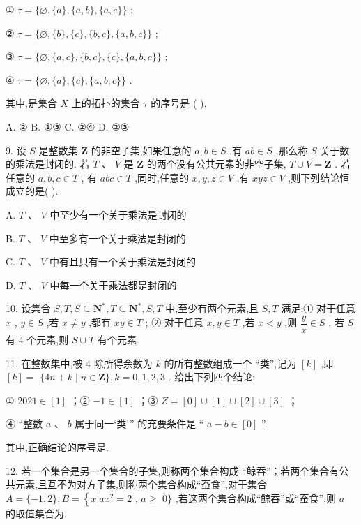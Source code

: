 ① $\tau  = \{ \varnothing ,\{ a\} ,\{ a,b\} ,\{ a,c\} \}$ ;

② $\tau  = \{ \varnothing ,\{ b\} ,\{ c\} ,\{ b,c\} ,\{ a,b,c\} \}$ ;

③ $\tau  = \{ \varnothing ,\{ a,c\} ,\{ b,c\} ,\{ c\} ,\{ a,b,c\} \}$ ;

④ $\tau  = \{ \varnothing ,\{ a\} ,\{ c\} ,\{ a,b,c\} \}$ .

其中,是集合 $X$ 上的拓扑的集合 $\tau$ 的序号是 (   ).

A. ② B. ①③ C. ②④ D. ②③

9. 设 $S$ 是整数集 $\mathbf{Z}$ 的非空子集,如果任意的 $a,b \in  S$ ,有 ${ab} \in  S$ ,那么称 $S$ 关于数的乘法是封闭的. 若 $T\text{ 、 }V$ 是 $\mathbf{Z}$ 的两个没有公共元素的非空子集, $T \cup  V = \mathbf{Z}$ . 若任意的 $a,b,c \in  T$ , 有 ${abc} \in  T$ ,同时,任意的 $x,y,z \in  V$ ,有 ${xyz} \in  V$ ,则下列结论恒成立的是(   ).

A. $T\text{ 、 }V$ 中至少有一个关于乘法是封闭的

B. $T\text{ 、 }V$ 中至多有一个关于乘法是封闭的

C. $T\text{ 、 }V$ 中有且只有一个关于乘法是封闭的

D. $T\text{ 、 }V$ 中每一个关于乘法都是封闭的

10. 设集合 $S,T,S \subseteq  {\mathbf{N}}^{ * },T \subseteq  {\mathbf{N}}^{ * },S,T$ 中,至少有两个元素,且 $S,T$ 满足:① 对于任意 $x$ , $y \in  S$ ,若 $x \neq  y$ ,都有 ${xy} \in  T$ ; ② 对于任意 $x,y \in  T$ ,若 $x < y$ ,则 $\dfrac{y}{x} \in  S$ . 若 $S$ 有 4 个元素,则 $S \cup  T$ 有\blkda{}个元素.

11. 在整数集中,被 4 除所得余数为 $k$ 的所有整数组成一个 “类”,记为 $\left\lbrack  k\right\rbrack$ ,即 $\left\lbrack  k\right\rbrack   =$  $\{ {4n} + k \mid  n \in  \mathbf{Z}\} ,k = 0,1,2,3$ . 给出下列四个结论:

① ${2021} \in  \left\lbrack  1\right\rbrack$ ；② $- 1 \in  \left\lbrack  1\right\rbrack$ ；③ ${Z} = \left\lbrack  0\right\rbrack   \cup  \left\lbrack  1\right\rbrack   \cup  \left\lbrack  2\right\rbrack   \cup  \left\lbrack  3\right\rbrack$ ；

④ “整数 $a\text{ 、 }b$ 属于同一‘类’” 的充要条件是 “ $a - b \in  \left\lbrack  0\right\rbrack$ ”.

其中,正确结论的序号是\blkda{}.

12. 若一个集合是另一个集合的子集,则称两个集合构成 “鲸吞”；若两个集合有公共元素,且互不为对方子集,则称两个集合构成“蚕食”,对于集合 $A = \{  - 1,2\} ,B = \left\{  {x\left| {a{x}^{2} = 2}\right. }\right.$ , $a \geq$  $0\}$ ,若这两个集合构成“鲸吞”或“蚕食”,则 $a$ 的取值集合为\blkda{}.

